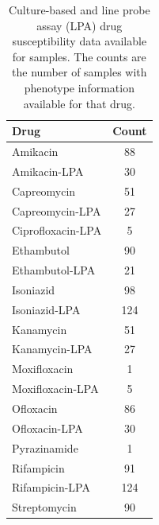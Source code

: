 \begin{table}
\centering
\begin{tabular}{|l|c|}
\hline
Drug              & Count \\ \hline
Amikacin          & 88    \\ \hline
Amikacin-LPA      & 30    \\ \hline
Capreomycin       & 51    \\ \hline
Capreomycin-LPA   & 27    \\ \hline
Ciprofloxacin-LPA & 5     \\ \hline
Ethambutol        & 90    \\ \hline
Ethambutol-LPA    & 21    \\ \hline
Isoniazid         & 98    \\ \hline
Isoniazid-LPA     & 124   \\ \hline
Kanamycin         & 51    \\ \hline
Kanamycin-LPA     & 27    \\ \hline
Moxifloxacin      & 1     \\ \hline
Moxifloxacin-LPA  & 5     \\ \hline
Ofloxacin         & 86    \\ \hline
Ofloxacin-LPA     & 30    \\ \hline
Pyrazinamide      & 1     \\ \hline
Rifampicin        & 91    \\ \hline
Rifampicin-LPA    & 124   \\ \hline
Streptomycin      & 90    \\ \hline
\end{tabular}
\caption{Culture-based and line probe assay (LPA) drug susceptibility data available for samples. The counts are the number of samples with phenotype information available for that drug.}
\label{tab:full-dst}
\end{table}

